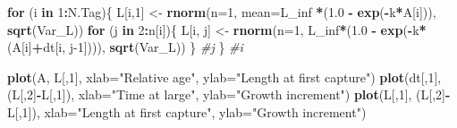 \documentclass[
]{krantz}
\makeatletter
\newenvironment{Shaded}{\begin{snugshade}}{\end{snugshade}}
\newcommand{\AttributeTok}[1]{\textcolor[rgb]{0.27,0.27,0.27}{#1}}
\newcommand{\CommentTok}[1]{\textcolor[rgb]{0.37,0.37,0.37}{\textit{#1}}}
\newcommand{\ControlFlowTok}[1]{\textcolor[rgb]{0.27,0.27,0.27}{\textbf{#1}}}
\newcommand{\DecValTok}[1]{\textcolor[rgb]{0.06,0.06,0.06}{#1}}
\newcommand{\FloatTok}[1]{\textcolor[rgb]{0.06,0.06,0.06}{#1}}
\newcommand{\FunctionTok}[1]{\textcolor[rgb]{0.27,0.27,0.27}{\textbf{#1}}}
\newcommand{\NormalTok}[1]{#1}
\newcommand{\OtherTok}[1]{\textcolor[rgb]{0.37,0.37,0.37}{#1}}
\newcommand{\SpecialCharTok}[1]{\textcolor[rgb]{0.43,0.43,0.43}{\textbf{#1}}}
\newcommand{\StringTok}[1]{\textcolor[rgb]{0.5,0.5,0.5}{#1}}
\newenvironment{kframe}{%
\medskip{}
\setlength{\fboxsep}{.8em}
 \def\at@end@of@kframe{}%
 \ifinner\ifhmode%
  \def\at@end@of@kframe{\end{minipage}}%
  \begin{minipage}{\columnwidth}%
 \fi\fi%
 \def\FrameCommand##1{\hskip\@totalleftmargin \hskip-\fboxsep
 \colorbox{shadecolor}{##1}\hskip-\fboxsep
     \hskip-\linewidth \hskip-\@totalleftmargin \hskip\columnwidth}%
 \MakeFramed {\advance\hsize-\width
   \@totalleftmargin\z@ \linewidth\hsize
   \@setminipage}}%
 {\par\unskip\endMakeFramed%
 \at@end@of@kframe}
\renewenvironment{Shaded}{\begin{kframe}}{\end{kframe}}
\makeatother
\begin{document}
\begin{Shaded}
\begin{Highlighting}[]
\ControlFlowTok{for}\NormalTok{ (i }\ControlFlowTok{in} \DecValTok{1}\SpecialCharTok{:}\NormalTok{N.Tag)\{}
\NormalTok{  L[i,}\DecValTok{1}\NormalTok{] }\OtherTok{\textless{}{-}} \FunctionTok{rnorm}\NormalTok{(}\AttributeTok{n=}\DecValTok{1}\NormalTok{, }\AttributeTok{mean=}\NormalTok{L\_inf }\SpecialCharTok{*}\NormalTok{(}\FloatTok{1.0} \SpecialCharTok{{-}} \FunctionTok{exp}\NormalTok{(}\SpecialCharTok{{-}}\NormalTok{k}\SpecialCharTok{*}\NormalTok{A[i])), }\FunctionTok{sqrt}\NormalTok{(Var\_L))}
  \ControlFlowTok{for}\NormalTok{ (j }\ControlFlowTok{in} \DecValTok{2}\SpecialCharTok{:}\NormalTok{n[i])\{}
\NormalTok{    L[i, j] }\OtherTok{\textless{}{-}} \FunctionTok{rnorm}\NormalTok{(}\AttributeTok{n=}\DecValTok{1}\NormalTok{, L\_inf}\SpecialCharTok{*}\NormalTok{(}\FloatTok{1.0} \SpecialCharTok{{-}} \FunctionTok{exp}\NormalTok{(}\SpecialCharTok{{-}}\NormalTok{k}\SpecialCharTok{*}\NormalTok{(A[i]}\SpecialCharTok{+}\NormalTok{dt[i, j}\DecValTok{{-}1}\NormalTok{]))), }
                     \FunctionTok{sqrt}\NormalTok{(Var\_L))}
\NormalTok{  \} }\CommentTok{\#j}
\NormalTok{\} }\CommentTok{\#i}

\FunctionTok{plot}\NormalTok{(A, L[,}\DecValTok{1}\NormalTok{], }\AttributeTok{xlab=}\StringTok{"Relative age"}\NormalTok{, }\AttributeTok{ylab=}\StringTok{"Length at first capture"}\NormalTok{)}
\FunctionTok{plot}\NormalTok{(dt[,}\DecValTok{1}\NormalTok{], (L[,}\DecValTok{2}\NormalTok{]}\SpecialCharTok{{-}}\NormalTok{L[,}\DecValTok{1}\NormalTok{]), }\AttributeTok{xlab=}\StringTok{"Time at large"}\NormalTok{, }
     \AttributeTok{ylab=}\StringTok{"Growth increment"}\NormalTok{)}
\FunctionTok{plot}\NormalTok{(L[,}\DecValTok{1}\NormalTok{], (L[,}\DecValTok{2}\NormalTok{]}\SpecialCharTok{{-}}\NormalTok{L[,}\DecValTok{1}\NormalTok{]), }\AttributeTok{xlab=}\StringTok{"Length at first capture"}\NormalTok{, }
     \AttributeTok{ylab=}\StringTok{"Growth increment"}\NormalTok{)}
\end{Highlighting}
\end{Shaded}
\end{document}
